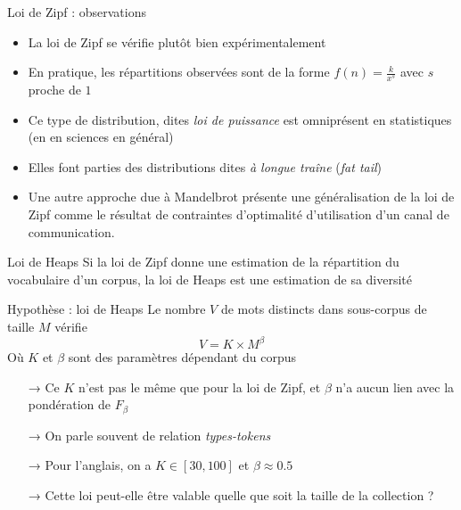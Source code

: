 \documentclass[xcolor={svgnames}, french]{beamer}
\begin{document}
\begin{frame}{Loi de Zipf : observations}
	\begin{itemize}
		\item La loi de Zipf se vérifie plutôt bien expérimentalement
		\item En pratique, les répartitions observées sont de la forme $f(n)=\frac{k}{x^s}$ avec $s$ proche de $1$
		\item Ce type de distribution, dites \emph{loi de puissance} est omniprésent en statistiques (en en sciences en général)
		\item Elles font parties des distributions dites \emph{à longue traîne} (\textit{fat tail})
		\item Une autre approche due à Mandelbrot présente une généralisation de la loi de Zipf comme le résultat de contraintes d'optimalité d'utilisation d'un canal de communication.
	\end{itemize}
\end{frame}

\begin{frame}{Loi de Heaps}
	Si la loi de Zipf donne une estimation de la répartition du vocabulaire d'un corpus, la loi de Heaps est une estimation de sa diversité
	\begin{block}{Hypothèse : loi de Heaps}
		Le nombre $V$ de mots distincts dans sous-corpus de taille $M$ vérifie
		\begin{equation}
			V = K×M^β
		\end{equation}
		Où $K$ et $β$ sont des paramètres dépendant du corpus
	\end{block}
	\begin{itemize}
		\item[→] Ce $K$ n'est pas le même que pour la loi de Zipf, et $β$ n'a aucun lien avec la pondération de $F_β$
		\item[→] On parle souvent de relation \emph{types-tokens}
		\item[→] Pour l'anglais, on a $K∈[30, 100]$ et $β≈0.5$
		\item[→] Cette loi peut-elle être valable quelle que soit la taille de la collection ?
	\end{itemize}
\end{frame}
\end{document}
